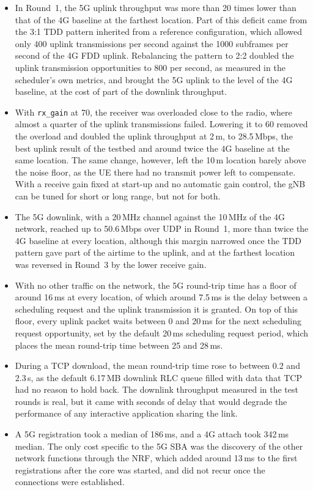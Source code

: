 \begin{itemize}
    \item In Round~1, the 5G uplink throughput was more than 20 times lower than that of the 4G baseline at the farthest location. Part of this deficit came from the 3:1 \gls{TDD} pattern inherited from a reference configuration, which allowed only 400 uplink transmissions per second against the 1000 subframes per second of the 4G \gls{FDD} uplink. Rebalancing the pattern to 2:2 doubled the uplink transmission opportunities to 800 per second, as measured in the scheduler's own metrics, and brought the 5G uplink to the level of the 4G baseline, at the cost of part of the downlink throughput.

    \item With \texttt{rx\_gain} at 70, the receiver was overloaded close to the radio, where almost a quarter of the uplink transmissions failed. Lowering it to 60 removed the overload and doubled the uplink throughput at 2\,m, to 28.5\,Mbps, the best uplink result of the testbed and around twice the 4G baseline at the same location. The same change, however, left the 10\,m location barely above the noise floor, as the \gls{UE} there had no transmit power left to compensate. With a receive gain fixed at start-up and no automatic gain control, the \gls{gNB} can be tuned for short or long range, but not for both.

    \item The 5G downlink, with a 20\,MHz channel against the 10\,MHz of the 4G network, reached up to 50.6\,Mbps over UDP in Round~1, more than twice the 4G baseline at every location, although this margin narrowed once the \gls{TDD} pattern gave part of the airtime to the uplink, and at the farthest location was reversed in Round~3 by the lower receive gain.

    \item With no other traffic on the network, the 5G round-trip time has a floor of around 16\,ms at every location, of which around 7.5\,ms is the delay between a scheduling request and the uplink transmission it is granted. On top of this floor, every uplink packet waits between 0 and 20\,ms for the next scheduling request opportunity, set by the default 20\,ms scheduling request period, which places the mean round-trip time between 25 and 28\,ms.

    \item During a TCP download, the mean round-trip time rose to between 0.2 and 2.3\,s, as the default 6.17\,MB downlink \gls{RLC} queue filled with data that TCP had no reason to hold back. The downlink throughput measured in the test rounds is real, but it came with seconds of delay that would degrade the performance of any interactive application sharing the link.

    \item A 5G registration took a median of 186\,ms, and a 4G attach took 342\,ms median. The only cost specific to the 5G \gls{SBA} was the discovery of the other network functions through the \gls{NRF}, which added around 13\,ms to the first registrations after the core was started, and did not recur once the connections were established.
\end{itemize}


